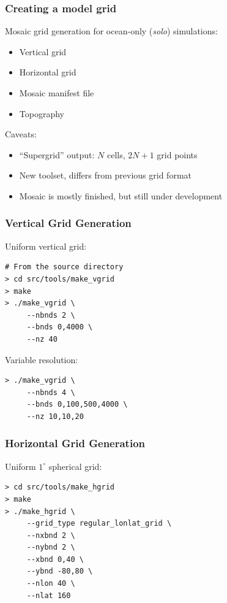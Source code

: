\documentclass{beamer}
\begin{document}
\begin{frame}
    \frametitle{Creating a model grid}
    
    Mosaic grid generation for ocean-only (\textit{solo}) simulations:
    \begin{itemize}
        \item Vertical grid
        \item Horizontal grid
        \item Mosaic manifest file
        \item Topography
    \end{itemize}
    
    Caveats:
    \begin{itemize}
        \item ``Supergrid'' output: $N$ cells, $2N+1$ grid points
        \item New toolset, differs from previous grid format
        \item Mosaic is mostly finished, but still under development
    \end{itemize}
\end{frame}

\begin{frame}[fragile]
    \frametitle{Vertical Grid Generation}
    
    Uniform vertical grid:
    \begin{lstlisting}
# From the source directory
> cd src/tools/make_vgrid
> make
> ./make_vgrid \
     --nbnds 2 \
     --bnds 0,4000 \
     --nz 40
    \end{lstlisting}
    
    Variable resolution:
    \begin{lstlisting}
> ./make_vgrid \
     --nbnds 4 \
     --bnds 0,100,500,4000 \
     --nz 10,10,20
    \end{lstlisting}
\end{frame}

\begin{frame}[fragile]
    \frametitle{Horizontal Grid Generation}
   
    Uniform $1^\circ$ spherical grid:
    \begin{lstlisting}
> cd src/tools/make_hgrid
> make
> ./make_hgrid \
     --grid_type regular_lonlat_grid \
     --nxbnd 2 \
     --nybnd 2 \
     --xbnd 0,40 \
     --ybnd -80,80 \
     --nlon 40 \
     --nlat 160
    \end{lstlisting}
\end{frame}
\end{document}
